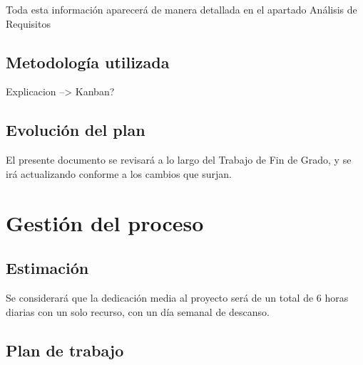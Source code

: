 \documentclass[openright,twoside,10pt]{book}
\begin{document}
    Toda esta información aparecerá de manera detallada en el apartado
    Análisis de Requisitos
    
    \subsection{Metodología utilizada}\label{metodologuxeda-utilizada}
    
    Explicacion --\textgreater{} Kanban?
    
    \subsection{Evolución del plan}\label{evoluciuxf3n-del-plan}
    
    El presente documento se revisará a lo largo del Trabajo de Fin de
    Grado, y se irá actualizando conforme a los cambios que surjan.
    
    \section{Gestión del proceso}\label{gestiuxf3n-del-proceso}
    
    \subsection{Estimación}\label{estimaciuxf3n}
    
    Se considerará que la dedicación media al proyecto será de un total de 6
    horas diarias con un solo recurso, con un día semanal de descanso.
    
    \subsection{Plan de trabajo}\label{plan-de-trabajo}
    
\end{document}
